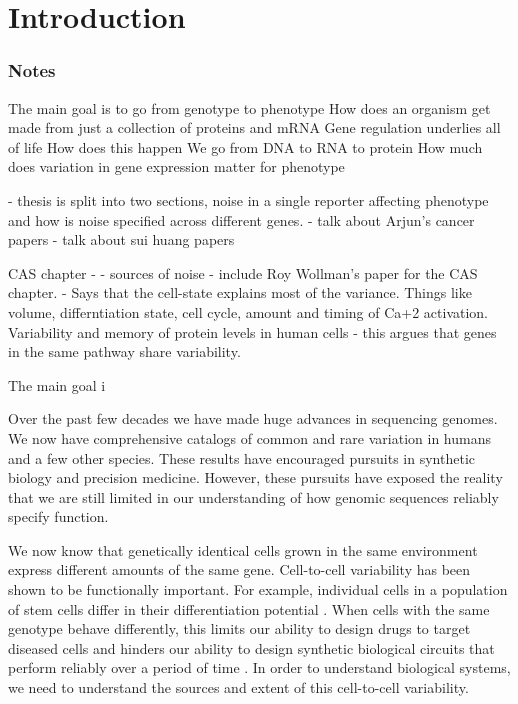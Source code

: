 \chapter{Introduction}
\label{chap:introduction}
\tightlists


\subsection{Notes}

The main goal is to go from genotype to phenotype
How does an organism get made from just a collection of proteins and mRNA
Gene regulation underlies all of life
How does this happen
We go from DNA to RNA to protein
How much does variation in gene expression matter for phenotype

- thesis is split into two sections, noise in a single reporter affecting phenotype and how is noise specified across different genes.
- talk about Arjun's cancer papers
- talk about sui huang papers


CAS chapter - - sources of noise
- include Roy Wollman's paper for the CAS chapter. 
    - Says that the cell-state explains most of the variance. Things like volume, differntiation state, cell cycle, amount and timing of Ca+2 activation.
Variability and memory of protein levels in human cells - this argues that genes in the same pathway share variability.


The main goal i     



Over the past few decades we have made huge advances in sequencing genomes. We now have  comprehensive catalogs of common and rare variation in humans and a few other species. These results have encouraged pursuits in synthetic biology and precision medicine. However, these pursuits have exposed the reality that we are still limited in our understanding of how genomic sequences reliably specify function. 

We now know that genetically identical cells grown in the same environment express different amounts of the same gene. Cell-to-cell variability has been shown to be functionally important. For example, individual cells in a population of stem cells differ in their differentiation potential \cite{chang_transcriptome-wide_2008}. When cells with the same genotype behave differently, this limits our ability to design drugs to target diseased cells and hinders our ability to design synthetic biological circuits that perform reliably over a period of time \cite{elowitz_synthetic_2000}. In order to understand biological systems, we need to understand the sources and extent of this cell-to-cell variability.

